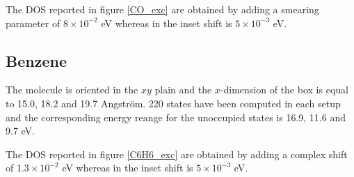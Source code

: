 \documentclass[reprint,aps,prb]{revtex4-1}
\renewcommand{\AA}{{Angstr\"om}}
\begin{document}
The DOS reported in figure \ref{CO_exc} are obtained by adding a smearing parameter of $8\times 10^{-2}$ eV whereas in the inset shift is $5\times 10^{-3}$ eV.

\subsection{Benzene}
The molecule is oriented in the $xy$ plain and the $x$-dimension of the box is equal to 15.0, 18.2 and 19.7 \AA.
220 states have been computed in each setup and the corresponding
energy reange for the unoccupied states is 16.9, 11.6 and 9.7 eV.

The DOS reported in figure \ref{C6H6_exc} are obtained by adding a complex shift of $1.3\times 10^{-2}$ eV whereas in the inset shift is $5\times 10^{-3}$ eV.



%

\end{document}
